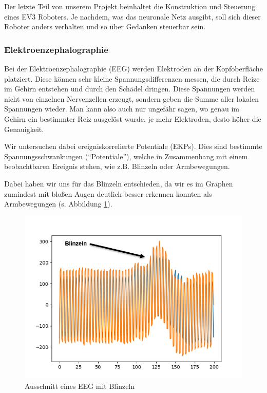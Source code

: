 \documentclass{scrartcl}
\begin{document}
	Der letzte Teil von unserem Projekt beinhaltet die Konstruktion und Steuerung eines EV3 Roboters. Je nachdem, was das neuronale Netz ausgibt, soll sich dieser Roboter anders verhalten und so über Gedanken steuerbar sein.	

	\subsubsection{Elektroenzephalographie}

	Bei der Elektroenzephalographie (EEG) werden Elektroden an der Kopfoberfläche platziert. Diese können sehr kleine Spannungsdifferenzen messen, die durch Reize im Gehirn entstehen und durch den Schädel dringen. Diese Spannungen werden nicht von einzelnen Nervenzellen erzeugt, sondern geben die Summe aller lokalen Spannungen wieder. Man kann also auch nur ungefähr sagen, wo genau im Gehirn ein bestimmter Reiz ausgelöst wurde, je mehr Elektroden, desto höher die Genauigkeit. \cite{wiki:EEG}

	Wir untersuchen dabei ereigniskorrelierte Potentiale (EKPs). Dies sind bestimmte Spannungsschwankungen (\enquote{Potentiale}), welche in Zusammenhang mit einem beobachtbaren Ereignis stehen, wie z.B. Blinzeln oder Armbewegungen. \cite{Birbaumer2010} \cite{Praktikum}

	Dabei haben wir uns für das Blinzeln entschieden, da wir es im Graphen zumindest mit bloßen Augen deutlich besser erkennen konnten als Armbewegungen (s. Abbildung \ref{EEG-Blinzeln}).

	\begin{figure}[h]
		\includegraphics{pictures/blinzeln_ekp_beispiel_pyplot_annotated.png}
		\caption{Ausschnitt eines EEG mit Blinzeln}
		\label{EEG-Blinzeln}
	\end{figure}
\end{document}
